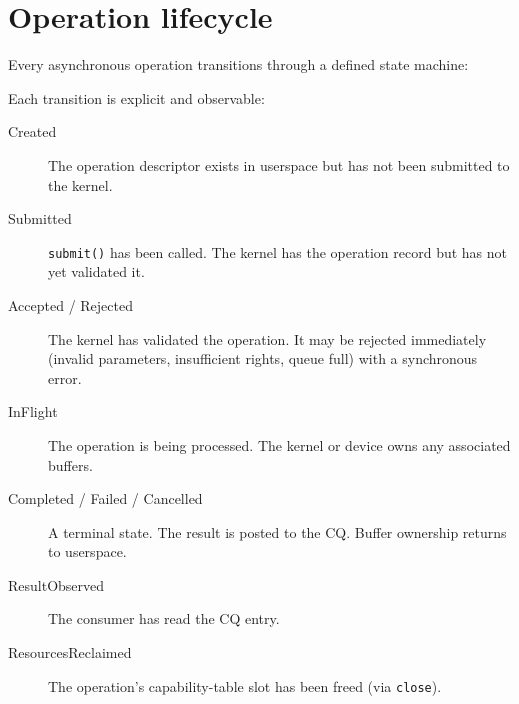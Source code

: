 \section{Operation lifecycle}

Every asynchronous operation transitions through a defined state machine:

\begin{center}
\end{center}

Each transition is explicit and observable:

\begin{description}
    \item[Created] The operation descriptor exists in userspace but has not been
        submitted to the kernel.
    \item[Submitted] \texttt{submit()} has been called. The kernel has the
        operation record but has not yet validated it.
    \item[Accepted / Rejected] The kernel has validated the operation. It may be
        rejected immediately (invalid parameters, insufficient rights, queue
        full) with a synchronous error.
    \item[InFlight] The operation is being processed. The kernel or device owns
        any associated buffers.
    \item[Completed / Failed / Cancelled] A terminal state. The result is posted
        to the CQ. Buffer ownership returns to userspace.
    \item[ResultObserved] The consumer has read the CQ entry.
    \item[ResourcesReclaimed] The operation's capability-table slot has been
        freed (via \texttt{close}).
\end{description}

